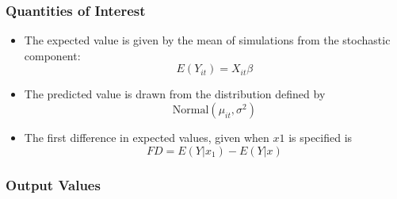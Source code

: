 \subsubsection{Quantities of Interest}
\begin{itemize}
\item 
The expected value is given by the mean of simulations from the stochastic component:
\[E(Y_{it}) = X_{it}\beta\]
\item The predicted value is drawn from the distribution defined by 
\[\mathrm{Normal}(\mu_{it}, \sigma^2)\]
\item The first difference in expected values, given when \(x1\) is specified is
\[FD = E(Y|x_1) - E(Y|x)\]
\end{itemize}


\subsubsection{Output Values}
